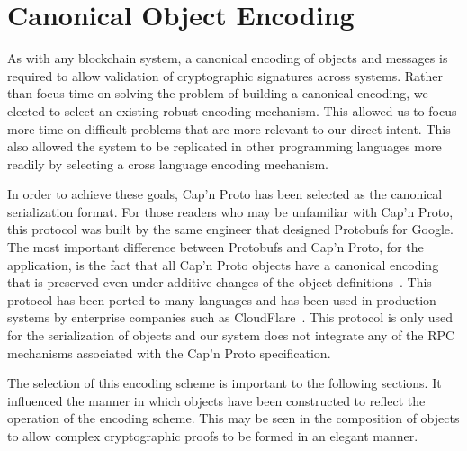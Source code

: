 \section{Canonical Object Encoding}

As with any blockchain system, a canonical encoding of objects and
messages is required to allow validation of cryptographic signatures
across systems.
Rather than focus time on solving the problem of building a canonical
encoding, we elected to select an existing robust encoding mechanism.
This allowed us to focus more time on difficult problems that are more
relevant to our direct intent.
This also allowed the system to be replicated in other programming
languages more readily by selecting a cross language encoding mechanism.

In order to achieve these goals, Cap'n Proto has been selected as the
canonical serialization format.
For those readers who may be unfamiliar with Cap'n Proto, this protocol
was built by the same engineer that designed Protobufs for Google.
The most important difference between Protobufs and Cap'n Proto, for
the \LayerTwo{} application, is the fact that all Cap'n Proto objects
have a canonical encoding that is preserved even under additive changes
of the object definitions~\cite{CapnProto}.
This protocol has been ported to many languages and has been used in
production systems by enterprise companies such as
CloudFlare~\cite{CapnProtoNews}.
This protocol is only used for the serialization of objects and our
system does not integrate any of the RPC mechanisms associated with the
Cap'n Proto specification.

The selection of this encoding scheme is important to the following
sections.
It influenced the manner in which objects have been constructed to
reflect the operation of the encoding scheme.
This may be seen in the composition of objects to allow complex
cryptographic proofs to be formed in an elegant manner.
